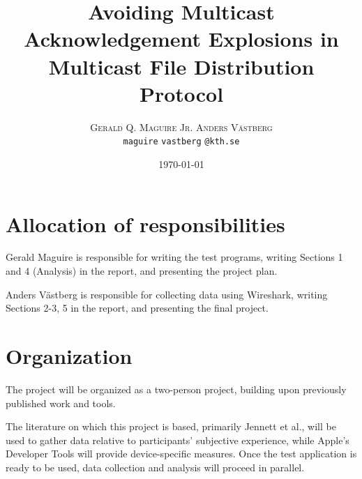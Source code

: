 \documentclass[12pt,twoside,english]{article}
\title{Avoiding Multicast Acknowledgement Explosions in Multicast File Distribution Protocol}
\author{
        \textsc{Gerald Q. Maguire Jr.}
            \qquad
        \textsc{Anders Västberg}
        \mbox{}\\
        \normalsize
            \texttt{maguire}
        \textbar{}
            \texttt{vastberg}
        \normalsize
            \texttt{@kth.se}
}
\date{\today}
\begin{document}
\maketitle







\section{Allocation of responsibilities}
\label{sect:alloc_responsibilities}

Gerald Maguire is responsible for writing the test programs, writing Sections 1 and 4 (Analysis) in the report, and presenting the project plan.

Anders Västberg is responsible for collecting data using Wireshark, writing Sections 2-3, 5 in the report, and presenting the final project.


\section{Organization}
\label{sect:organization}

The project will be organized as a two-person project, building upon previously published work and tools. 

The literature on which this project is based, primarily Jennett et al.\cite{jennett_measuring_2008}, will be used to gather data relative to participants' subjective experience, while Apple's Developer Tools will provide device-specific measures.
Once the test application is ready to be used, data collection and analysis will proceed in parallel.
\end{document}
